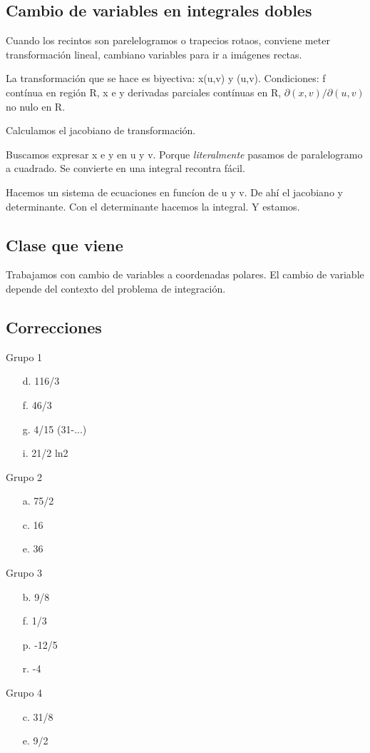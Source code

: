 \subsection{Cambio de variables en integrales dobles}

Cuando los recintos son parelelogramos o trapecios rotaos,
conviene meter transformación lineal,
cambiano variables para ir a imágenes rectas.

La transformación que se hace es biyectiva: x(u,v) y (u,v).
Condiciones: f contínua en región R,
x e y derivadas parciales contínuas en R,
\(\partial(x,v)/\partial(u,v)\) no nulo en R.

Calculamos el jacobiano de transformación.

Buscamos expresar x e y en u y v.
Porque \textit{literalmente} pasamos de paralelogramo a cuadrado.
Se convierte en una integral recontra fácil.

Hacemos un sistema de ecuaciones en funcíon de u y v.
De ahí el jacobiano y determinante.
Con el determinante hacemos la integral.
Y estamos.

\subsection{Clase que viene}

Trabajamos con cambio de variables a coordenadas polares.
El cambio de variable depende del contexto del problema de integración.

\subsection{Correcciones}

Grupo 1
\begin{enumerate}
    \item [d.] 116/3
    \item [f.] 46/3
    \item [g.] 4/15 (31-...)
    \item [i.] 21/2 ln2
\end{enumerate}

Grupo 2
\begin{enumerate}
    \item [a.] 75/2
    \item [c.] 16
    \item [e.] 36
\end{enumerate}

Grupo 3
\begin{enumerate}
    \item [b.] 9/8
    \item [f.] 1/3
    \item [p.] -12/5
    \item [r.] -4
\end{enumerate}

Grupo 4
\begin{enumerate}
    \item [c.] 31/8
    \item [e.] 9/2
\end{enumerate}
